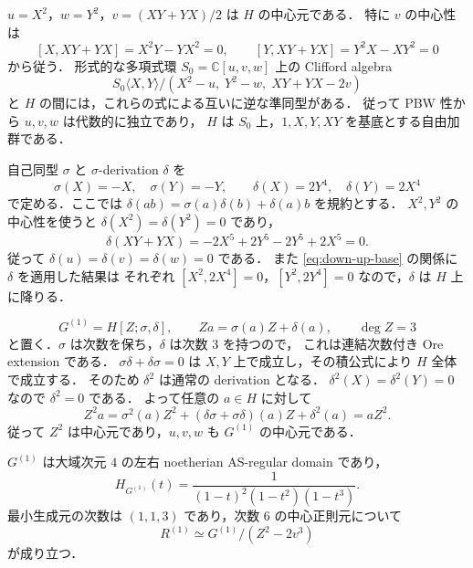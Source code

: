 $u=X^2$，$w=Y^2$，$v=(XY+YX)/2$ は $H$ の中心元である．
特に $v$ の中心性は
\[
 [X,XY+YX]=X^2Y-YX^2=0,\qquad
 [Y,XY+YX]=Y^2X-XY^2=0
\]
から従う．
形式的な多項式環 $S_0=\mathbb C[u,v,w]$ 上の Clifford algebra
\[
 S_0\langle X,Y\rangle/(X^2-u,\;Y^2-w,\;XY+YX-2v)
\]
と $H$ の間には，これらの式による互いに逆な準同型がある．
従って PBW 性から $u,v,w$ は代数的に独立であり，
$H$ は $S_0$ 上，$1,X,Y,XY$ を基底とする自由加群である．

自己同型 $\sigma$ と $\sigma$-derivation $\delta$ を
\[
 \sigma(X)=-X,\quad\sigma(Y)=-Y,\qquad
 \delta(X)=2Y^4,\quad\delta(Y)=2X^4
\]
で定める．ここでは $\delta(ab)=\sigma(a)\delta(b)+\delta(a)b$ を規約とする．
$X^2,Y^2$ の中心性を使うと $\delta(X^2)=\delta(Y^2)=0$ であり，
\[
 \delta(XY+YX)
 =-2X^5+2Y^5-2Y^5+2X^5=0.
\]
従って $\delta(u)=\delta(v)=\delta(w)=0$ である．
また \eqref{eq:down-up-base} の関係に $\delta$ を適用した結果は
それぞれ $[X^2,2X^4]=0$，$[Y^2,2Y^4]=0$ なので，$\delta$ は $H$ 上に降りる．

\begin{equation}
 G^{(1)}=H[Z;\sigma,\delta],\qquad
 Z a=\sigma(a)Z+\delta(a),\qquad \deg Z=3
 \label{eq:ambient-d1}
\end{equation}
と置く．$\sigma$ は次数を保ち，$\delta$ は次数 $3$ を持つので，
これは連結次数付き Ore extension である．
$\sigma\delta+\delta\sigma=0$ は $X,Y$ 上で成立し，その積公式により $H$ 全体で成立する．
そのため $\delta^2$ は通常の derivation となる．
$\delta^2(X)=\delta^2(Y)=0$ なので $\delta^2=0$ である．
よって任意の $a\in H$ に対して
\[
 Z^2a=\sigma^2(a)Z^2+
 (\delta\sigma+\sigma\delta)(a)Z+\delta^2(a)=aZ^2.
\]
従って $Z^2$ は中心元であり，$u,v,w$ も $G^{(1)}$ の中心元である．

\begin{proposition}
$G^{(1)}$ は大域次元 $4$ の左右 noetherian AS-regular domain であり，
\[
 H_{G^{(1)}}(t)=\frac1{(1-t)^2(1-t^2)(1-t^3)}.
\]
最小生成元の次数は $(1,1,3)$ であり，次数 $6$ の中心正則元について
\begin{equation}
 R^{(1)}\simeq G^{(1)}/(Z^2-2v^3)
 \label{eq:d1-hypersurface}
\end{equation}
が成り立つ．
\end{proposition}

